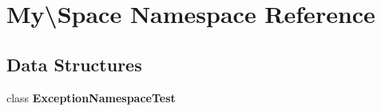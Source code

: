 \section{My\textbackslash{}Space Namespace Reference}
\label{namespace_my_1_1_space}
\subsection*{Data Structures}
\begin{DoxyCompactItemize}
\item 
class {\bf Exception\+Namespace\+Test}
\end{DoxyCompactItemize}
